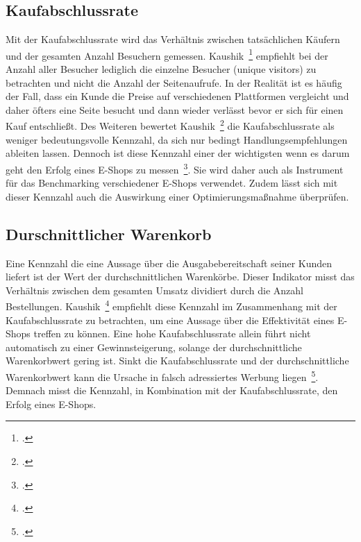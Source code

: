 \subsection{Kaufabschlussrate}
Mit der Kaufabschlussrate wird das Verhältnis zwischen tatsächlichen Käufern und der gesamten Anzahl Besuchern gemessen. Kaushik~\footcite[Vgl. ][Seite 55-56]{Kaushik.2010} empfiehlt bei der Anzahl aller Besucher lediglich die einzelne Besucher (unique visitors) zu betrachten und nicht die Anzahl der Seitenaufrufe. In der Realität ist es häufig der Fall, dass ein Kunde die Preise auf verschiedenen Plattformen vergleicht und daher öfters eine Seite besucht und dann wieder verlässt bevor er sich für einen Kauf entschließt. Des Weiteren bewertet Kaushik~\footcite[Vgl. ][Seite 336-338]{Kaushik.2007} die Kaufabschlussrate als weniger bedeutungsvolle Kennzahl, da sich nur bedingt Handlungsempfehlungen ableiten lassen. Dennoch ist diese Kennzahl einer der wichtigsten wenn es darum geht den Erfolg eines E-Shops zu messen~\footcite[Vgl. ][Seite 31]{website:webanalyticsdemystified:ebook}. Sie wird daher auch als Instrument für das Benchmarking verschiedener E-Shops verwendet. Zudem lässt sich mit dieser Kennzahl auch die Auswirkung einer Optimierungsmaßnahme überprüfen.

\subsection{Durschnittlicher Warenkorb}
Eine Kennzahl die eine Aussage über die Ausgabebereitschaft seiner Kunden liefert ist der Wert der durchschnittlichen Warenkörbe. Dieser Indikator misst das Verhältnis zwischen dem gesamten Umsatz dividiert durch die Anzahl Bestellungen. Kaushik~\footcite[Vgl. ][Seite 153]{Kaushik.2010} empfiehlt diese Kennzahl im Zusammenhang mit der Kaufabschlussrate zu betrachten, um eine Aussage über die Effektivität eines E-Shops treffen zu können. Eine hohe Kaufabschlussrate allein führt nicht automatisch zu einer Gewinnsteigerung, solange der durchschnittliche Warenkorbwert gering ist. Sinkt die Kaufabschlussrate und der durchschnittliche Warenkorbwert kann die Ursache in falsch adressiertes Werbung liegen~\footcite[Vgl. ][Seite 30-31]{website:webanalyticsdemystified:ebook}. Demnach misst die Kennzahl, in Kombination mit der Kaufabschlussrate, den Erfolg eines E-Shops.

